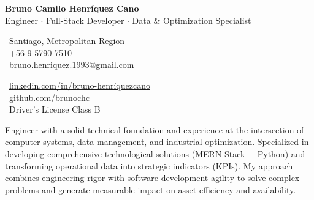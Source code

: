 \documentclass[10pt,letterpaper]{article}
\begin{document}
\begin{center}
    {\Huge \textbf{Bruno Camilo Henríquez Cano}} \\[0.2cm]
    {\Large Engineer $\cdot$ Full-Stack Developer $\cdot$ Data \& Optimization Specialist}
\end{center}

\vspace{0.3cm}

\noindent
\begin{minipage}[t]{0.5\textwidth}
    \faMapMarker\ Santiago, Metropolitan Region \\
    \faPhone\ +56 9 5790 7510 \\
    \faEnvelope\ \href{mailto:bruno.henriquez.1993@gmail.com}{bruno.henriquez.1993@gmail.com}
\end{minipage}
\begin{minipage}[t]{0.5\textwidth}
    \faLinkedin\ \href{https://linkedin.com/in/bruno-henríquezcano}{linkedin.com/in/bruno-henríquezcano} \\
    \faGithub\ \href{https://github.com/brunochc}{github.com/brunochc} \\
    \faCar\ Driver's License Class B
\end{minipage}

\vspace{0.4cm}


\vspace{0.2cm}

\noindent Engineer with a solid technical foundation and experience at the intersection of computer systems, data management, and industrial optimization. Specialized in developing comprehensive technological solutions (MERN Stack + Python) and transforming operational data into strategic indicators (KPIs). My approach combines engineering rigor with software development agility to solve complex problems and generate measurable impact on asset efficiency and availability.

\vspace{0.4cm}


\vspace{0.3cm}
\end{document}
